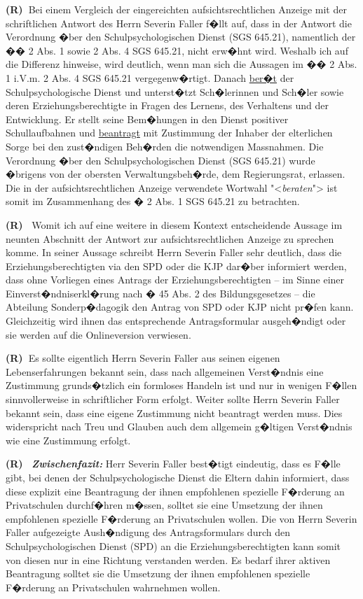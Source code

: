 \documentclass[paper=a4,fontsize=12pt, oneside, numbers=noenddot]{scrbook}
\newcounter{rz}
\newcommand{\Rz}{\addtocounter{rz}{1}\textbf{(R\arabic{rz})~}}
\newcommand{\RzLabel}[1]{\refstepcounter{rz}\label{#1}\textbf{(R\arabic{rz})~}}
\begin{document}
	
	\Rz Bei einem Vergleich der eingereichten aufsichtsrechtlichen Anzeige mit der schriftlichen Antwort des Herrn Severin Faller f�llt auf, dass in der Antwort die  Verordnung �ber den Schulpsychologischen Dienst (SGS 645.21), namentlich der �� 2 Abs. 1 sowie 2 Abs. 4 SGS 645.21, nicht erw�hnt wird. Weshalb ich auf die Differenz hinweise, wird deutlich, wenn man sich die Aussagen im �� 2 Abs. 1 i.V.m. 2 Abs. 4 SGS 645.21 vergegenw�rtigt. Danach \underline{ber�t} der Schulpsychologische Dienst und unterst�tzt Sch�lerinnen und Sch�ler sowie deren Erziehungsberechtigte in Fragen des Lernens, des Verhaltens und der Entwicklung. Er stellt seine Bem�hungen in den Dienst positiver Schullaufbahnen und \underline{beantragt} mit Zustimmung der Inhaber der elterlichen Sorge bei den zust�ndigen Beh�rden die notwendigen Massnahmen. Die Verordnung �ber den Schulpsychologischen Dienst (SGS 645.21) wurde �brigens von der obersten Verwaltungsbeh�rde, dem Regierungsrat, erlassen. Die in der aufsichtsrechtlichen Anzeige verwendete Wortwahl "<\textit{beraten}"> ist somit im Zusammenhang des � 2 Abs. 1 SGS 645.21 zu betrachten.
	
	
	\RzLabel{Beantragung4Zustimmung} Womit ich auf eine weitere in diesem Kontext entscheidende Aussage im neunten Abschnitt der Antwort zur aufsichtsrechtlichen Anzeige zu sprechen komme. In seiner Aussage schreibt Herrn Severin Faller sehr deutlich, dass die Erziehungsberechtigten via den SPD oder die KJP dar�ber informiert werden, dass ohne Vorliegen eines Antrags der Erziehungsberechtigten -- im Sinne einer Einverst�ndniserkl�rung nach � 45 Abs. 2 des Bildungsgesetzes -- die Abteilung Sonderp�dagogik den Antrag von SPD oder KJP nicht pr�fen kann. Gleichzeitig wird ihnen das entsprechende Antragsformular ausgeh�ndigt oder sie werden auf die Onlineversion verwiesen. 
	
	\Rz Es sollte eigentlich Herrn Severin Faller aus seinen eigenen Lebenserfahrungen bekannt sein, dass nach allgemeinen Verst�ndnis eine Zustimmung grunds�tzlich ein formloses Handeln ist und nur in wenigen F�llen sinnvollerweise in schriftlicher Form erfolgt. Weiter sollte Herrn Severin Faller bekannt sein, dass eine eigene Zustimmung nicht beantragt werden muss. Dies widerspricht nach Treu und Glauben auch dem allgemein g�ltigen Verst�ndnis wie eine Zustimmung erfolgt.
	
	\RzLabel{ZwischenfazitSF2} \textit{\textbf{Zwischenfazit:}} Herr Severin Faller best�tigt eindeutig, dass es F�lle gibt, bei denen der Schulpsychologische Dienst die Eltern dahin informiert, dass diese explizit eine Beantragung der ihnen empfohlenen spezielle F�rderung an Privatschulen durchf�hren m�ssen, solltet sie eine Umsetzung der ihnen empfohlenen spezielle F�rderung an Privatschulen wollen. Die von Herrn Severin Faller aufgezeigte Aush�ndigung des Antragsformulars durch den Schulpsychologischen Dienst (SPD) an die Erziehungsberechtigten kann somit von diesen nur in eine Richtung verstanden werden. Es bedarf ihrer aktiven Beantragung solltet sie die Umsetzung der ihnen empfohlenen spezielle F�rderung an Privatschulen wahrnehmen wollen. 
	
\end{document}

